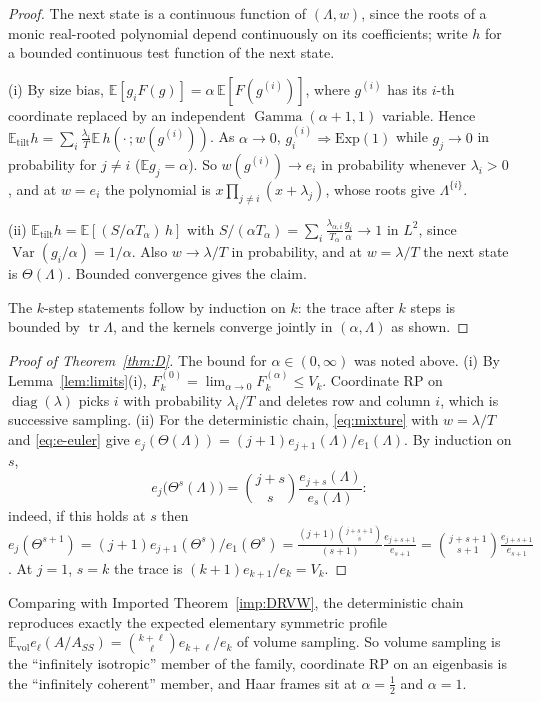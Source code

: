 \documentclass[11pt,a4paper]{article}
\theoremstyle{definition}
\newcommand{\E}{\mathbb{E}}
\newcommand{\tr}{\operatorname{tr}}
\newcommand{\diag}{\operatorname{diag}}
\newcommand{\Gam}{\operatorname{Gamma}}
\newcommand{\tilt}{\mathrm{tilt}}
\newcommand{\vol}{\mathrm{vol}}
\begin{document}
\begin{proof}
The next state is a continuous function of $(\Lambda,w)$, since the roots of a monic real-rooted polynomial depend continuously on its coefficients; write $h$ for a bounded continuous test function of the next state.

(i) By size bias, $\E[g_iF(g)]=\alpha\,\E[F(g^{(i)})]$, where $g^{(i)}$ has its $i$-th coordinate replaced by an independent $\Gam(\alpha+1,1)$ variable. Hence $\E_\tilt h=\sum_i\frac{\lambda_i}T\E\,h(\cdot\,;w(g^{(i)}))$. As $\alpha\to0$, $g^{(i)}_i\Rightarrow\mathrm{Exp}(1)$ while $g_j\to0$ in probability for $j\ne i$ ($\E g_j=\alpha$). So $w(g^{(i)})\to e_i$ in probability whenever $\lambda_i>0$, and at $w=e_i$ the polynomial is $x\prod_{j\ne i}(x+\lambda_j)$, whose roots give $\Lambda^{\{i\}}$.

(ii) $\E_\tilt h=\E[(S/\alpha T_\alpha)\,h]$ with $S/(\alpha T_\alpha)=\sum_i\frac{\lambda_{\alpha,i}}{T_\alpha}\frac{g_i}\alpha\to1$ in $L^2$, since $\operatorname{Var}(g_i/\alpha)=1/\alpha$. Also $w\to\lambda/T$ in probability, and at $w=\lambda/T$ the next state is $\Theta(\Lambda)$. Bounded convergence gives the claim.

The $k$-step statements follow by induction on $k$: the trace after $k$ steps is bounded by $\tr\Lambda$, and the kernels converge jointly in $(\alpha,\Lambda)$ as shown.
\end{proof}

\begin{proof}[Proof of Theorem~\ref{thm:D}]
The bound for $\alpha\in(0,\infty)$ was noted above. (i) By Lemma~\ref{lem:limits}(i), $F^{(0)}_k=\lim_{\alpha\to0}F^{(\alpha)}_k\le V_k$. Coordinate RP on $\diag(\lambda)$ picks $i$ with probability $\lambda_i/T$ and deletes row and column $i$, which is successive sampling. (ii) For the deterministic chain, \eqref{eq:mixture} with $w=\lambda/T$ and \eqref{eq:e-euler} give $e_j(\Theta(\Lambda))=(j+1)e_{j+1}(\Lambda)/e_1(\Lambda)$. By induction on $s$,
\[
e_j\big(\Theta^s(\Lambda)\big)=\binom{j+s}{s}\frac{e_{j+s}(\Lambda)}{e_s(\Lambda)}:
\]
indeed, if this holds at $s$ then $e_j(\Theta^{s+1})=(j+1)e_{j+1}(\Theta^s)/e_1(\Theta^s)=\frac{(j+1)\binom{j+s+1}{s}}{(s+1)}\frac{e_{j+s+1}}{e_{s+1}}=\binom{j+s+1}{s+1}\frac{e_{j+s+1}}{e_{s+1}}$. At $j=1$, $s=k$ the trace is $(k+1)e_{k+1}/e_k=V_k$.
\end{proof}

Comparing with Imported Theorem~\ref{imp:DRVW}, the deterministic chain reproduces exactly the expected elementary symmetric profile $\E_\vol e_\ell(A/A_{SS})=\binom{k+\ell}\ell e_{k+\ell}/e_k$ of volume sampling. So volume sampling is the ``infinitely isotropic'' member of the family, coordinate RP on an eigenbasis is the ``infinitely coherent'' member, and Haar frames sit at $\alpha=\frac12$ and $\alpha=1$.
\end{document}
